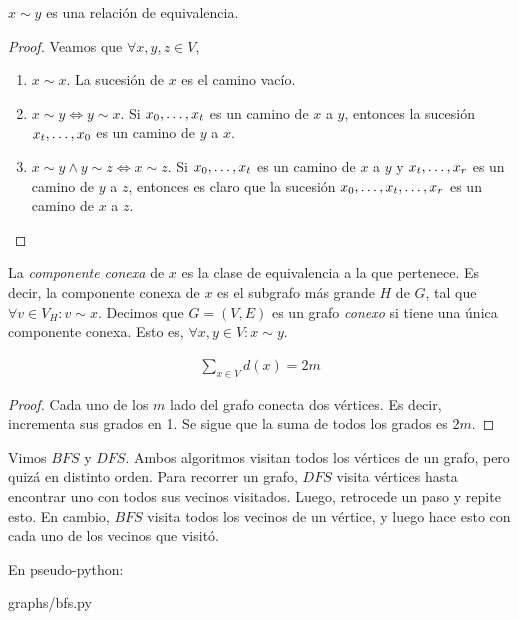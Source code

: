 \begin{proposition}
  $x \sim y$ es una relación de equivalencia.
\end{proposition}
\begin{proof}
  Veamos que $\forall x,y,z \in V,$
  \begin{enumerate}
  \item $x \sim x$. La sucesión de $x$ es el camino vacío.
    
  \item $x \sim y \iff y \sim x$. Si $x_0, \mathellipsis, x_t$ es un camino
    de $x$ a $y$, entonces la sucesión $x_t, \mathellipsis, x_0$ es un camino
    de $y$ a $x$.
    
  \item $x \sim y \wedge y \sim z \iff x \sim z$. Si $x_0, \mathellipsis, x_t$
    es un camino de $x$ a $y$ y $x_{t}, \mathellipsis, x_{r}$ es un camino de
    $y$ a $z$, entonces es claro que la sucesión
    $x_0, \mathellipsis, x_t, \mathellipsis, x_r$ es un camino de $x$ a $z$.
  \end{enumerate}
\end{proof}

\begin{definition}
  La \emph{componente conexa} de $x$ es la clase de equivalencia a la que
  pertenece. Es decir, la componente conexa de $x$ es el subgrafo más grande
  $H$ de $G$, tal que $\forall v \in V_H \colon v \sim x$. Decimos que
  $G=(V,E)$ es un grafo \emph{conexo} si tiene una única componente conexa.
  Esto es, $\forall x,y \in V \colon x \sim y$.
\end{definition}

\begin{proposition}
  \begin{align}
    \sum_{x\in V} d(x) = 2m \label{handshaking_lemma}
  \end{align}
\end{proposition}

\begin{proof}
  Cada uno de los $m$ lado del grafo conecta dos vértices. Es decir, incrementa
  sus grados en 1. Se sigue que la suma de todos los grados es $2m$.
\end{proof}


\begin{definition}
  Vimos $BFS$ y $DFS$. Ambos algoritmos visitan todos los vértices de un
  grafo, pero quizá en distinto orden. Para recorrer un grafo, $DFS$ visita
  vértices hasta encontrar uno con todos sus vecinos visitados. Luego,
  retrocede un paso y repite esto. En cambio, $BFS$ visita todos los vecinos
  de un vértice, y luego hace esto con cada uno de los vecinos que visitó.
  
  En pseudo-python:

\begin{lstinputlisting}[language=python]{graphs/bfs.py}
\end{lstinputlisting}
\end{definition}
